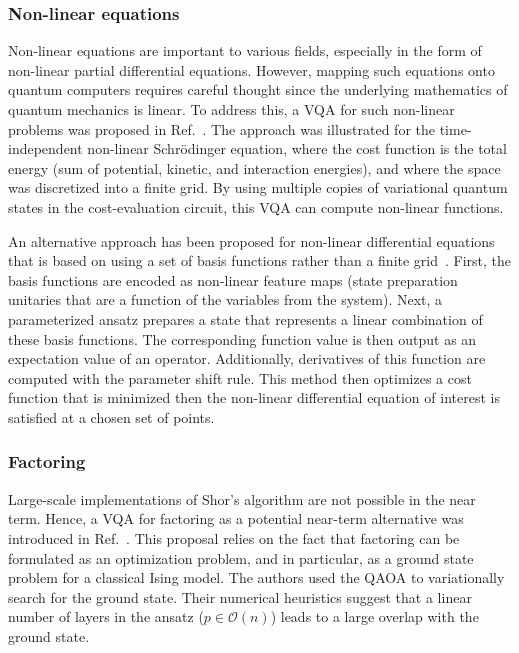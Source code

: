 \documentclass[prx,twocolumn,floatfix,superscriptaddress,longbibliography]{revtex4-1}
\newcommand{\<}{\langle}
\renewcommand{\>}{\rangle}
\newcommand{\OC}{\mathcal{O}}
\begin{document}
\subsubsection{ Non-linear equations} Non-linear equations are important to various fields, especially in the form of non-linear partial differential equations. However, mapping such equations onto quantum computers requires careful thought since the underlying mathematics of quantum mechanics is linear. To address this, a VQA for such non-linear problems was proposed in Ref.~\cite{lubasch2020variational}. The approach was illustrated for the time-independent non-linear Schr\"odinger equation, where the cost function is the total energy (sum of potential, kinetic, and interaction energies), and where the space was discretized into a finite grid. By using multiple copies of variational quantum states in the cost-evaluation circuit, this VQA can compute non-linear functions. 

An alternative approach has been proposed for non-linear differential equations that is based on using a set of basis functions rather than a finite grid~\cite{kyriienko2020solving}. First, the basis functions are encoded as non-linear feature maps (state preparation unitaries that are a function of the variables from the system). Next, a parameterized ansatz prepares a state that represents a linear combination of these basis functions. The corresponding function value is then output as an expectation value of an operator. Additionally, derivatives of this function are computed with the parameter shift rule. This method then optimizes a cost function that is minimized then the non-linear differential equation of interest is satisfied at a chosen set of points. 


\subsubsection{ Factoring} Large-scale implementations of Shor's algorithm are not possible in the near term. Hence, a VQA for factoring as a potential near-term alternative was introduced in Ref.~\cite{anschuetz2019variational}. This proposal relies on the fact that factoring can be formulated as an optimization problem, and in particular, as a ground state problem for a classical Ising model. The authors used the QAOA to variationally search for the ground state. Their numerical heuristics suggest that a linear number of layers in the ansatz ($p\in \OC(n)$) leads to a large overlap with the ground state. 
\end{document}

